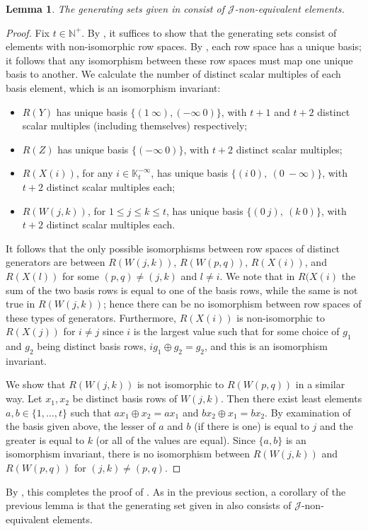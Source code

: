 \documentclass[11pt]{article}
\newtheorem{lemma}[thm]{Lemma}
\numberwithin{equation}{section}
\newcommand{\J}{\mathscr{J}}
\newcommand{\N}{\mathbb{N}}
\newcommand{\Np}{\N^{+}}
\newcommand{\K}{\mathbb{K}}
\newcommand{\Kmaxt}{\K^{-\infty}_t}
\begin{document}
\begin{lemma}
  The generating sets given in  consist of
  $\J$-non-equivalent elements.
\end{lemma}
\begin{proof}
  Fix $t \in \Np$. By , it suffices to show that the
generating sets consist of elements with non-isomorphic row spaces. By
, each row space has a unique basis; it
follows that any isomorphism between these row spaces must map one unique basis
to another. We calculate the number of distinct scalar multiples of each basis
element, which is an isomorphism invariant:

\begin{itemize}
  \item 
    $R(Y)$ has unique basis $\{(1~\infty), (-\infty~0)\}$, with $t + 1$ and $t
    + 2$ distinct scalar multiples (including themselves) respectively;
  \item
    $R(Z)$ has unique basis $\{(-\infty~0)\}$, with $t + 2$ distinct scalar
    multiples;
  \item
    $R(X(i))$, for any $i \in \Kmaxt$, has unique basis
    $\{(i~0),~(0~-\infty)\}$, with $t + 2$ distinct scalar multiples each;
  \item $R(W(j, k))$, for $1 \leq j \leq k \leq t$, has unique basis
    $\{(0~j),~(k~0)\}$, with $t + 2$ distinct scalar multiples each.
\end{itemize}
It follows that the only possible isomorphisms between row spaces of distinct
generators are between $R(W(j, k))$, $R(W(p, q))$, $R(X(i))$, and $R(X(l))$ for
some $(p, q) \neq (j, k)$ and $l \neq i$. We note that in $R(X(i)$ the sum of
the two basis rows is equal to one of the basis rows, while the same is not true
in $R(W(j, k))$; hence there can be no isomorphism between row spaces of these
types of generators. Furthermore, $R(X(i))$ is non-isomorphic to $R(X(j))$ for
$i \neq j$ since $i$ is the largest value such that for some choice of $g_1$ and
$g_2$ being distinct basis rows, $ig_1 \oplus g_2 = g_2$, and this is an
isomorphism invariant.

We show that $R(W(j, k))$ is not isomorphic to $R(W(p, q))$ in a similar
way. Let $x_1, x_2$ be distinct basis rows of $W(j, k)$. Then there exist least
elements $a, b \in \{1, \ldots, t\}$ such that $ax_1 \oplus x_2 = ax_1$ and
$bx_2 \oplus x_1 = bx_2$. By examination of the basis given above, the lesser of
$a$ and $b$ (if there is one) is equal to $j$ and the greater is equal to $k$
(or all of the values are equal). Since $\{a, b\}$ is an isomorphism invariant,
there is no isomorphism between $R(W(j, k))$ and $R(W(p, q))$ for $(j, k) \neq
(p, q)$.
\end{proof}
By , this completes the proof of
. As in the previous section, a corollary of the
previous lemma is that the generating set given in 
also consists of $\J$-non-equivalent elements.
\end{document}
